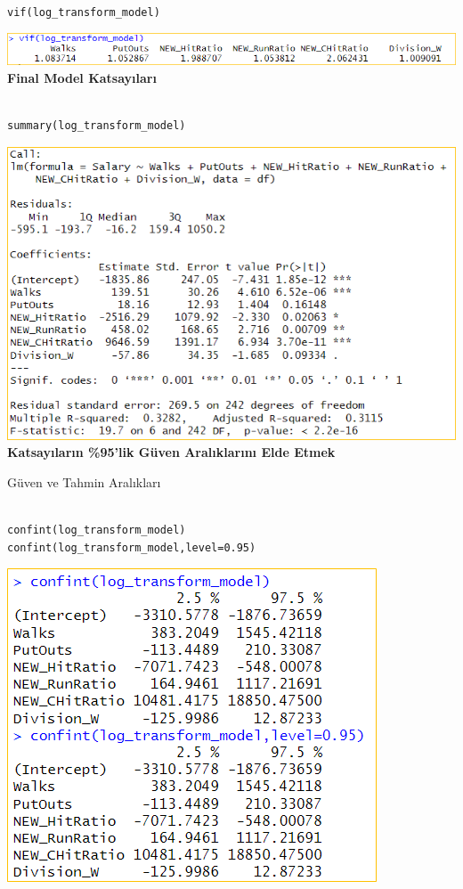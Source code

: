 \documentclass[
]{article}
\begin{document}
\begin{verbatim}

vif(log_transform_model)
\end{verbatim}

\includegraphics{Picture6.png}\textbf{Final Model Katsayıları}

\begin{verbatim}

summary(log_transform_model)
\end{verbatim}

\includegraphics{Picture5.png}\textbf{Katsayıların \%95'lik Güven
Aralıklarını Elde Etmek}

Güven ve Tahmin Aralıkları

\begin{verbatim}

confint(log_transform_model)
confint(log_transform_model,level=0.95)
\end{verbatim}

\includegraphics{Picture14.png}
\end{document}
